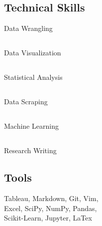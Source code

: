 \documentclass[]{sahana}
\begin{document}
\begin{minipage}[t]{0.33\textwidth}
\subsection{}\vspace{-12pt}
\vspace{6pt}
\subsection{Technical Skills}
Data Wrangling \hfill{}\hspace{40pt}
\subsection{}\vspace{-12pt}
Data Visualization \hfill{}\hspace{40pt}
\subsection{}\vspace{-12pt}
Statistical Analysis \hfill{}\hspace{40pt}
\subsection{}\vspace{-12pt}
Data Scraping \hfill{}\hspace{40pt}
\subsection{}\vspace{-12pt}
Machine Learning \hfill{}\hspace{40pt}
\subsection{}\vspace{-12pt}
Research Writing \hfill{}\hspace{40pt}
\subsection{}\vspace{-12pt}
\vspace{6pt}
\subsection{Tools}
Tableau, Markdown, Git, Vim,\\ Excel, SciPy, NumPy, Pandas, \\ Scikit-Learn, Jupyter, LaTex


\sectionsep

%
%

\end{minipage} 
\end{document}
